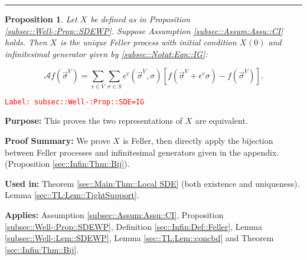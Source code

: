 \documentclass[12pt]{article}
\newcommand{\mc}{\mathcal}
\newcommand{\ep}{\epsilon}
\newcommand{\tr}{\textcolor{red}}
\newcommand{\labe}[1]{\tr{\texttt{Label: #1}}}
\newcommand{\purpose}{\textbf{Purpose: }}
\newcommand{\pfsum}{\textbf{Proof Summary: }}
\newcommand{\usein}{\textbf{Used in: }}
\newcommand{\app}{\textbf{Applies: }}
\newcommand{\lin}{\rule{\linewidth}{0.4 pt}}
\renewcommand{\v}{v}							%
\renewcommand{\S}{S}							%
\newcommand{\s}{\sigma}							%
\newcommand{\sv}{\vec{\s}}						%
\newcommand{\ev}{\ep}							%
\newcommand{\X}{X}								%
\newcommand{\IG}{\mc{A}}						%
\newcommand{\IGr}{c}							%
\newcommand{\vind}[1]{^{#1}}					%
\newcommand{\vsi}[1]{^{#1}}						%
\newcommand{\cind}[1]{_{#1}}					%
\newcommand{\tp}[1]{(#1)}						%
\newcommand{\tip}[1]{#1}						%
\newtheorem{prop}[thms]{Proposition}
\begin{document}
\lin

\begin{prop}
Let \(\X\cind{}\tip{}\) be defined as in Proposition \ref{subsec::Well-:Prop::SDEWP}. Suppose Assumption \ref{subsec::Assum:Assu::CI} holds. Then \(\X\cind{}\tip{}\) is the unique Feller process with initial condition \(\X\cind{}\tp{0}\) and infinitesimal generator given by \eqref{subsec::Notat:Eqn::IG}:

\[\IG f(\sv\cind{}\vsi{V}) = \sum_{\v\in V}\sum_{\s \in \S} \IGr\vind{\v}(\sv\cind{}\vsi{V},\s)[f(\sv\cind{}\vsi{V} + \ev\vind{\v}\s) - f(\sv\cind{}\vsi{V})].\]
\label{subsec::Well-:Prop::SDE=IG}
\end{prop}
\labe{subsec::Well-:Prop::SDE=IG}

\purpose This proves the two representations of \(\X\cind{}\tip{}\) are equivalent.

\pfsum We prove \(\X\cind{}\tip{}\) is Feller, then directly apply the bijection between Feller processes and infinitesimal generators given in the appendix. (Proposition \ref{sec::Infin:Thm::Bij}).

\usein Theorem \ref{sec::Main:Thm::Local SDE} (both existence and uniqueness). Lemma \ref{sec::TL:Lem::TightSupport}.

\app Assumption \ref{subsec::Assum:Assu::CI}, Proposition \ref{subsec::Well-:Prop::SDEWP}, Definition \ref{sec::Infin:Def::Feller}, Lemma \ref{subsec::Well-:Lem::SDEWP}, Lemma \ref{sec::TL:Lem::concbd} and Theorem \ref{sec::Infin:Thm::Bij}.
\end{document}
